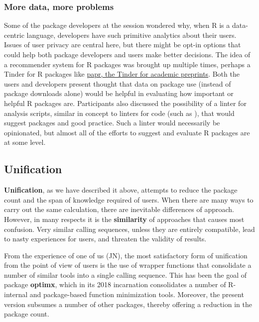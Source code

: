 \hypertarget{more-data-more-problems}{%
\subsubsection{More data, more problems}\label{more-data-more-problems}}

Some of the package developers at the session wondered why, when R is a
data-centric language, developers have such primitive analytics about
their users. Issues of user privacy are central here, but there might be
opt-in options that could help both package developers and users make
better decisions. The idea of a recommender system for R packages was
brought up multiple times, perhaps a Tinder for R packages like
\href{https://simplystatistics.org/2016/10/03/papr/}{papr, the Tinder
for academic preprints}. Both the users and developers present thought
that data on package use (instead of package downloads alone) would be
helpful in evaluating how important or helpful R packages are.
Participants also discussed the possibility of a linter for analysis
scripts, similar in concept to linters for code (such as \citet{lintr}),
that would suggest packages and good practice. Such a linter would
necessarily be opinionated, but almost all of the efforts to suggest and
evaluate R packages are at some level.

\hypertarget{unification}{%
\subsection{Unification}\label{unification}}

\textbf{Unification}, as we have described it above, attempts to reduce
the package count and the span of knowledge required of users. When
there are many ways to carry out the same calculation, there are
inevitable differences of approach. However, in many respects it is the
\textbf{similarity} of approaches that causes most confusion. Very
similar calling sequences, unless they are entirely compatible, lead to
nasty experiences for users, and threaten the validity of results.

From the experience of one of us (JN), the most satisfactory form of
unification from the point of view of users is the use of wrapper
functions that consolidate a number of similar tools into a single
calling sequence. This has been the goal of package \textbf{optimx},
which in its 2018 incarnation consolidates a number of R-internal and
package-based function minimization tools. Moreover, the present version
subsumes a number of other packages, thereby offering a reduction in the
package count.

